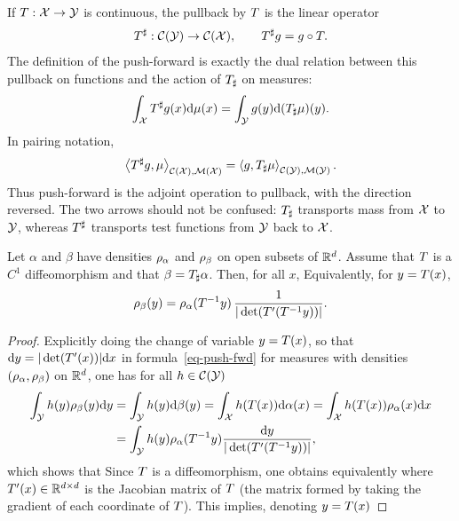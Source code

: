 \begin{rem}\label{rem-pullback-pushforward}\label{rem-push-forward-pull-back}
	If $T:\mathcal{X}\to\mathcal{Y}$ is continuous, the pullback by $T$ is the linear operator
	\[
		T^\sharp:\mathcal{C}(\mathcal{Y})\to\mathcal{C}(\mathcal{X}),
		\qquad
		T^\sharp g=g\circ T .
	\]
	The definition of the push-forward is exactly the dual relation between this pullback on functions and the action of $T_\sharp$ on measures:
	\[
		\int_{\mathcal{X}} T^\sharp g(x)\mathrm{d}\mu(x)
		=
		\int_{\mathcal{Y}} g(y)\mathrm{d}(T_\sharp\mu)(y).
	\]
	In pairing notation,
	\[
		\left\langle T^\sharp g,\mu\right\rangle_{\mathcal{C}(\mathcal{X}),\mathcal{M}(\mathcal{X})}
		=
		\left\langle g,T_\sharp\mu\right\rangle_{\mathcal{C}(\mathcal{Y}),\mathcal{M}(\mathcal{Y})}.
	\]
	Thus push-forward is the adjoint operation to pullback, with the direction reversed. The two arrows should not be confused: $T_\sharp$ transports mass from $\mathcal{X}$ to $\mathcal{Y}$, whereas $T^\sharp$ transports test functions from $\mathcal{Y}$ back to $\mathcal{X}$.
\end{rem}


\begin{prop}\label{prop-push-forward-densities}
	Let $\alpha$ and $\beta$ have densities $\rho_{\alpha}$ and $\rho_{\beta}$ on open subsets of $\mathbb{R}^d$. Assume that $T$ is a $C^1$ diffeomorphism and that $\beta=T_\sharp\alpha$. Then, for all $x$,
	Equivalently, for $y=T(x)$,
	\[
		\rho_\beta(y)=\rho_\alpha(T^{-1}y)\,
		\frac{1}{|\det(T'(T^{-1}y))|}.
	\]
\end{prop}

\begin{proof}
Explicitly doing the change of variable $y=T(x)$, so that $\mathrm{d} y = |\det(T'(x))| \mathrm{d} x$ in formula~\eqref{eq-push-fwd} for measures with densities $(\rho_{\alpha},\rho_{\beta})$ on $\mathbb{R}^d$, one has for all $h \in \mathcal{C}(\mathcal{Y})$
\begin{align*}
	\int_{\mathcal{Y}} h(y)\rho_\beta(y) \mathrm{d} y &= \int_{\mathcal{Y}} h(y) \mathrm{d} \beta(y) = \int_{\mathcal{X}} h(T(x)) \mathrm{d} \alpha(x) = \int_{\mathcal{X}} h(T(x)) \rho_\alpha(x) \mathrm{d} x \\
		&= \int_{\mathcal{Y}} h(y) \rho_\alpha(T^{-1}y) \frac{\mathrm{d} y}{|\det(T'(T^{-1} y))|},
\end{align*}
which shows that
Since $T$ is a diffeomorphism, one obtains equivalently
where $T'(x) \in \mathbb{R}^{d \times d}$ is the Jacobian matrix of $T$ (the matrix formed by taking the gradient of each coordinate of $T$).
%
This implies, denoting $y=T(x)$
\end{proof}

